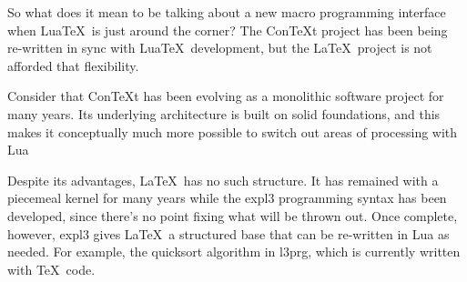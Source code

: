\documentclass{ltugboat}
\def\pkg#1{\textsf{#1}}
\begin{document}
So what does it mean to be talking about a new macro programming interface
when Lua\TeX\ is just around the corner? The Con\TeX{}t project has been being
re-written in sync with Lua\TeX\ development, but the \LaTeX\ project is not
afforded that flexibility.

Consider that Con\TeX{}t has been evolving as a monolithic software project
for many years. Its underlying architecture is built on solid foundations, and
this makes it conceptually much more possible to switch out areas of
processing with Lua

Despite its advantages, \LaTeX\ has no such structure. It has remained with a
piecemeal kernel for many years while the \pkg{expl3} programming syntax has
been developed, since there's no point fixing what will be thrown out. Once
complete, however, \pkg{expl3} gives \LaTeX\ a structured base that can be
re-written in Lua as needed. For example, the quicksort algorithm in
\pkg{l3prg}, which is currently written with \TeX\ code.
\end{document}
